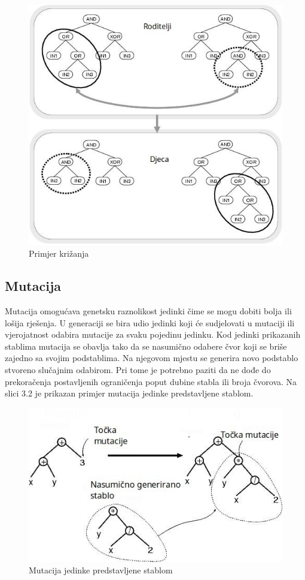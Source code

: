 \documentclass[times, utf8, zavrsni]{fer}
\begin{document}
\begin{figure}[htb]
\centering
\includegraphics[scale=0.6]{images/krizanje}
\caption{Primjer križanja}
\end{figure}

\subsection{Mutacija}
Mutacija omogućava genetsku raznolikost jedinki čime se mogu dobiti bolja ili lošija rješenja. U generaciji se bira udio jedinki koji će sudjelovati u mutaciji ili vjerojatnost odabira mutacije za svaku pojedinu jedinku. Kod jedinki prikazanih stablima mutacija se obavlja tako da se nasumično odabere čvor koji se briše zajedno sa svojim podstablima. Na njegovom mjestu se generira novo podstablo stvoreno slučajnim odabirom. Pri tome je potrebno paziti da ne dođe do prekoračenja postavljenih ograničenja poput dubine stabla ili broja čvorova. Na slici 3.2 je prikazan primjer mutacija jedinke predstavljene stablom. 


\begin{figure}[htb]
\centering
\includegraphics[scale=0.6]{images/mutacija}
\caption{Mutacija jedinke predstavljene stablom}
\end{figure}
\end{document}
